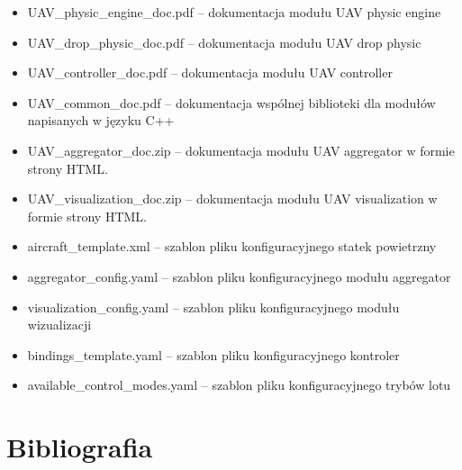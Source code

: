 \documentclass[15pt]{sprawozdanie}
\begin{document}
\begin{itemize} %
\item UAV\_physic\_engine\_doc.pdf -- dokumentacja modułu UAV physic engine
\item UAV\_drop\_physic\_doc.pdf -- dokumentacja modułu UAV drop physic
\item UAV\_controller\_doc.pdf -- dokumentacja modułu UAV controller
\item UAV\_common\_doc.pdf -- dokumentacja wspólnej biblioteki dla modułów napisanych w języku C++
\item UAV\_aggregator\_doc.zip -- dokumentacja modułu UAV aggregator w formie strony HTML.
\item UAV\_visualization\_doc.zip -- dokumentacja modułu UAV visualization w formie strony HTML.

\item aircraft\_template.xml -- szablon pliku konfiguracyjnego statek powietrzny
\item aggregator\_config.yaml -- szablon pliku konfiguracyjnego modułu aggregator
\item visualization\_config.yaml -- szablon pliku konfiguracyjnego modułu wizualizacji
\item bindings\_template.yaml -- szablon pliku konfiguracyjnego kontroler
\item available\_control\_modes.yaml -- szablon pliku konfiguracyjnego trybów lotu
\end{itemize}


\newpage
\section{Bibliografia}

\nocite{*}

\printbibliography[type=book,heading=subbibliography,title={Literatura}]
\printbibliography[type=article,heading=subbibliography,title={Artykuły}]
\printbibliography[type=online,heading=subbibliography,title={Źródła internetowe}]
\end{document}
